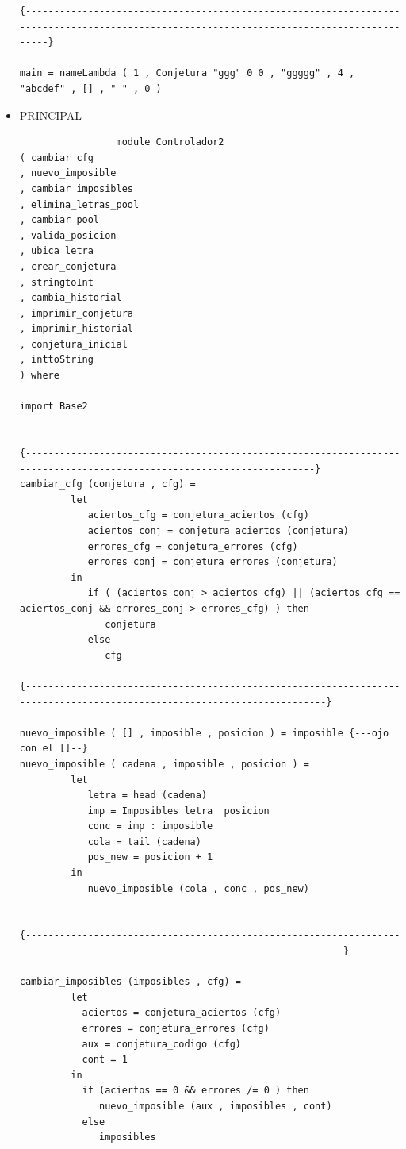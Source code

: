 \begin{itemize}
\begin{verbatim}
{------------------------------------------------------------------------------------------------------------------------------------------}      
   
main = nameLambda ( 1 , Conjetura "ggg" 0 0 , "ggggg" , 4 , "abcdef" , [] , " " , 0 )

                \end{verbatim}

       \item PRINCIPAL

                  \begin{verbatim}
                 module Controlador2
( cambiar_cfg
, nuevo_imposible
, cambiar_imposibles
, elimina_letras_pool
, cambiar_pool
, valida_posicion
, ubica_letra
, crear_conjetura
, stringtoInt
, cambia_historial
, imprimir_conjetura
, imprimir_historial
, conjetura_inicial
, inttoString
) where

import Base2


{----------------------------------------------------------------------------------------------------------------------}
cambiar_cfg (conjetura , cfg) = 
         let
            aciertos_cfg = conjetura_aciertos (cfg)
            aciertos_conj = conjetura_aciertos (conjetura)
            errores_cfg = conjetura_errores (cfg)
            errores_conj = conjetura_errores (conjetura)
         in
            if ( (aciertos_conj > aciertos_cfg) || (aciertos_cfg == aciertos_conj && errores_conj > errores_cfg) ) then
               conjetura
            else
               cfg

{------------------------------------------------------------------------------------------------------------------------}

nuevo_imposible ( [] , imposible , posicion ) = imposible {---ojo con el []--}
nuevo_imposible ( cadena , imposible , posicion ) = 
         let
            letra = head (cadena)
            imp = Imposibles letra  posicion
            conc = imp : imposible
            cola = tail (cadena)
            pos_new = posicion + 1
         in
            nuevo_imposible (cola , conc , pos_new)


{---------------------------------------------------------------------------------------------------------------------------}

cambiar_imposibles (imposibles , cfg) = 
         let
           aciertos = conjetura_aciertos (cfg)
           errores = conjetura_errores (cfg)
           aux = conjetura_codigo (cfg)
           cont = 1
         in
           if (aciertos == 0 && errores /= 0 ) then
              nuevo_imposible (aux , imposibles , cont)
           else
              imposibles



\end{verbatim}
\end{itemize}
